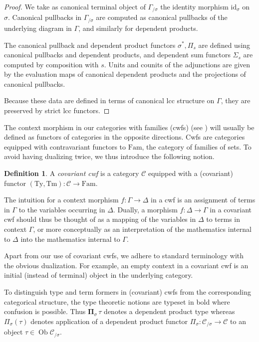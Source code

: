 \documentclass[a4paper]{article}
\theoremstyle{remark}
\theoremstyle{definition}
\newtheorem{definition}[theorem]{Definition}
\begin{document}
\begin{proof}
  We take as canonical terminal object of $\Gamma_{/ \sigma}$ the identity morphism $\mathrm{id}_\sigma$ on $\sigma$.
  Canonical pullbacks in $\Gamma_{/ \sigma}$ are computed as canonical pullbacks of the underlying diagram in $\Gamma$, and similarly for dependent products. 
  
  The canonical pullback and dependent product functors $\sigma^*, \Pi_s$ are defined using canonical pullbacks and dependent products, and dependent sum functors $\Sigma_s$ are computed by composition with $s$.
  Units and counits of the adjunctions are given by the evaluation maps of canonical dependent products and the projections of canonical pullbacks.

  Because these data are defined in terms of canonical lcc structure on $\Gamma$, they are preserved by strict lcc functors.
\end{proof}

The context morphism in our categories with families (cwfs) (see \cite{internal-type-theory}) will usually be defined as functors of categories in the opposite directions.
Cwfs are categories equipped with contravariant functors to $\mathrm{Fam}$, the category of families of sets.
To avoid having dualizing twice, we thus introduce the following notion.
\begin{definition}
  A \emph{covariant cwf} is a category $\mathcal{C}$ equipped with a (covariant) functor $(\mathrm{Ty}, \mathrm{Tm}) : \mathcal{C} \rightarrow \mathrm{Fam}$.
\end{definition}
The intuition for a context morphism $f : \Gamma \rightarrow \Delta$ in a cwf is an assignment of terms in $\Gamma$ to the variables occurring in $\Delta$.
Dually, a morphism $f : \Delta \rightarrow \Gamma$ in a covariant cwf should thus be thought of as a mapping of the variables in $\Delta$ to terms in context $\Gamma$, or more conceptually as an interpretation of the mathematics internal to $\Delta$ into the mathematics internal to $\Gamma$.

Apart from our use of covariant cwfs, we adhere to standard terminology with the obvious dualization.
For example, an empty context in a covariant cwf is an initial (instead of terminal) object in the underlying category.

To distinguish type and term formers in (covariant) cwfs from the corresponding categorical structure, the type theoretic notions are typeset in bold where confusion is possible.
Thus $\mathbf{\Pi}_\sigma \, \tau$ denotes a dependent product type whereas $\Pi_\sigma(\tau)$ denotes application of a dependent product functor $\Pi_\sigma : \mathcal{C}_{/ \sigma} \rightarrow \mathcal{C}$ to an object $\tau \in \operatorname{Ob} \mathcal{C}_{/ \sigma}$.
\end{document}
